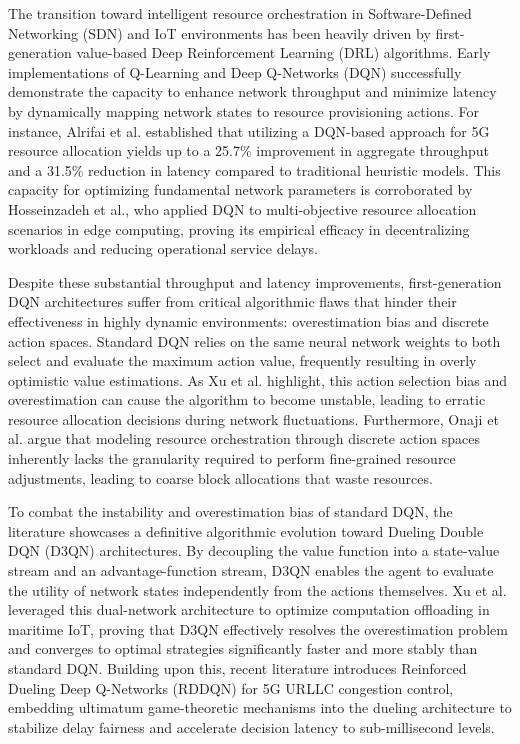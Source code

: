 \documentclass[conference]{IEEEtran}
\begin{document}
The transition toward intelligent resource orchestration in Software-Defined Networking (SDN) and IoT environments has been heavily driven by first-generation value-based Deep Reinforcement Learning (DRL) algorithms. Early implementations of Q-Learning and Deep Q-Networks (DQN) successfully demonstrate the capacity to enhance network throughput and minimize latency by dynamically mapping network states to resource provisioning actions. For instance, Alrifai et al. established that utilizing a DQN-based approach for 5G resource allocation yields up to a 25.7\% improvement in aggregate throughput and a 31.5\% reduction in latency compared to traditional heuristic models\cite{b14}. This capacity for optimizing fundamental network parameters is corroborated by Hosseinzadeh et al., who applied DQN to multi-objective resource allocation scenarios in edge computing, proving its empirical efficacy in decentralizing workloads and reducing operational service delays\cite{b15}.

Despite these substantial throughput and latency improvements, first-generation DQN architectures suffer from critical algorithmic flaws that hinder their effectiveness in highly dynamic environments: overestimation bias and discrete action spaces. Standard DQN relies on the same neural network weights to both select and evaluate the maximum action value, frequently resulting in overly optimistic value estimations. As Xu et al. highlight, this action selection bias and overestimation can cause the algorithm to become unstable, leading to erratic resource allocation decisions during network fluctuations\cite{b13}. Furthermore, Onaji et al. argue that modeling resource orchestration through discrete action spaces inherently lacks the granularity required to perform fine-grained resource adjustments, leading to coarse block allocations that waste resources\cite{b6}.

To combat the instability and overestimation bias of standard DQN, the literature showcases a definitive algorithmic evolution toward Dueling Double DQN (D3QN) architectures. By decoupling the value function into a state-value stream and an advantage-function stream, D3QN enables the agent to evaluate the utility of network states independently from the actions themselves. Xu et al. leveraged this dual-network architecture to optimize computation offloading in maritime IoT, proving that D3QN effectively resolves the overestimation problem and converges to optimal strategies significantly faster and more stably than standard DQN\cite{b13}. Building upon this, recent literature introduces Reinforced Dueling Deep Q-Networks (RDDQN) for 5G URLLC congestion control, embedding ultimatum game-theoretic mechanisms into the dueling architecture to stabilize delay fairness and accelerate decision latency to sub-millisecond levels\cite{b16}.
\end{document}
